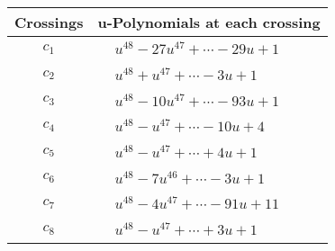 \documentclass[1p]{elsarticle_modified}
\theoremstyle{definition}
\begin{document}
\begin{tabular}{m{50pt}|m{274pt}}
Crossings & \hspace{64pt}u-Polynomials at each crossing \\
\hline $$\begin{aligned}c_{1}\end{aligned}$$&$\begin{aligned}
&u^{48}-27 u^{47}+\cdots-29 u+1
\end{aligned}$\\
\hline $$\begin{aligned}c_{2}\end{aligned}$$&$\begin{aligned}
&u^{48}+u^{47}+\cdots-3 u+1
\end{aligned}$\\
\hline $$\begin{aligned}c_{3}\end{aligned}$$&$\begin{aligned}
&u^{48}-10 u^{47}+\cdots-93 u+1
\end{aligned}$\\
\hline $$\begin{aligned}c_{4}\end{aligned}$$&$\begin{aligned}
&u^{48}- u^{47}+\cdots-10 u+4
\end{aligned}$\\
\hline $$\begin{aligned}c_{5}\end{aligned}$$&$\begin{aligned}
&u^{48}- u^{47}+\cdots+4 u+1
\end{aligned}$\\
\hline $$\begin{aligned}c_{6}\end{aligned}$$&$\begin{aligned}
&u^{48}-7 u^{46}+\cdots-3 u+1
\end{aligned}$\\
\hline $$\begin{aligned}c_{7}\end{aligned}$$&$\begin{aligned}
&u^{48}-4 u^{47}+\cdots-91 u+11
\end{aligned}$\\
\hline $$\begin{aligned}c_{8}\end{aligned}$$&$\begin{aligned}
&u^{48}- u^{47}+\cdots+3 u+1
\end{aligned}$\\

\end{tabular}
\end{document}
